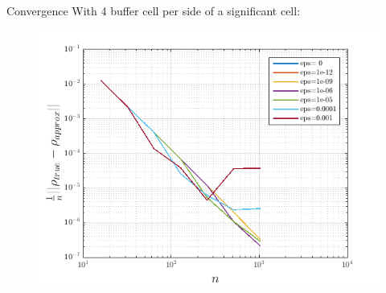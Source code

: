 \documentclass{beamer}
\begin{document}
\begin{frame}{Convergence}
  With 4 buffer cell per side of a significant cell:
  \begin{figure}
    \center
    \includegraphics[scale=0.5]{buffer4.png}
  \end{figure}
\end{frame}
\end{document}
